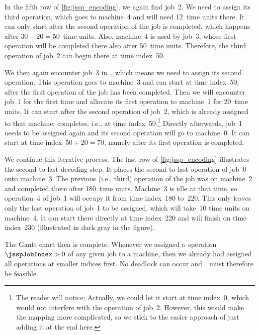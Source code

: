 In the fifth row of \cref{fig:jssp_encoding}, we again find job~2.
We need to assign its third operation, which goes to machine~4 and will need 12~time units there.
It can only start after the second operation of the job is completed, which happens after $30+20=50$~time units.
Also, machine~4 is used by job~3, whose first operation will be completed there also after 50~time units.
Therefore, the third operation of job~2 can begin there at time index~50.

We then again encounter job~3 in~\sespel, which means we need to assign its second operation.
This operation goes to machine~3 and can start at time index~50, after the first operation of the job has been completed.
Then we will encounter job~1 for the first time and allocate its first operation to machine~1 for 20~time units.
It can start after the second operation of job~2, which is already assigned to that machine, completes, i.e., at time index~50.\footnote{%
The reader will notice: %
Actually, we could let it start at time index~0, which would not interfere with the operation of job~2. %
However, this would make the mapping more complicated, so we stick to the easier approach of just adding it at the end here.}
Directly afterwards, job~1 needs to be assigned again and its second operation will go to machine~0.
It can start at time index~$50+20=70$, namely after its first operation is completed.

We continue this iterative process.
The last row of \cref{fig:jssp_encoding} illustrates the second-to-last decoding step.
It places the second-to-last operation of job~0 onto machine~3.
The previous (i.e., third) operation of the job was on machine~2 and completed there after 180~time units.
Machine~3 is idle at that time, so operation~4 of job~1 will occupy it from time index~180 to~220.
This only leaves only the last operation of job~1 to be assigned, which will take~10 time units on machine~4.
It can start there directly at time index~220 and will finish on time index~230 (illustrated in dark gray in the figure).

The Gantt chart then is complete.
Whenever we assigned a operation~$\jsspJobIndex>0$ of any given job to a machine, then we already had assigned all operations at smaller indices first.
No deadlock can occur and~\solspel\ must therefore be feasible.


